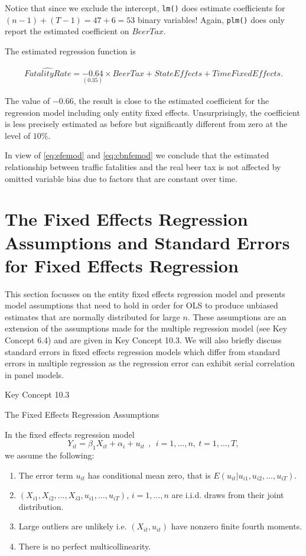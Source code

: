 \documentclass[]{book}
\theoremstyle{definition}
\theoremstyle{definition}
\theoremstyle{definition}
\theoremstyle{remark}
\begin{document}
Notice that since we exclude the intercept, \texttt{lm()} does estimate
coefficients for \((n-1) + (T-1) = 47 + 6 = 53\) binary variables!
Again, \texttt{plm()} does only report the estimated coefficient on
\(BeerTax\).

The estimated regression function is

\begin{align}
\widehat{FatalityRate} =  \underset{(0.35)}{-0.64} \times BeerTax + StateEffects + TimeFixedEffects. \label{eq:cbnfemod}
\end{align}

The value of \(-0.66\), the result is close to the estimated coefficient
for the regression model including only entity fixed effects.
Unsurprisingly, the coefficient is less precisely estimated as before
but significantly different from zero at the level of \(10\%\).

In view of \eqref{eq:efemod} and \eqref{eq:cbnfemod} we conclude that the
estimated relationship between traffic fatalities and the real beer tax
is not affected by omitted variable bias due to factors that are
constant over time.

\section{The Fixed Effects Regression Assumptions and Standard Errors
for Fixed Effects
Regression}\label{the-fixed-effects-regression-assumptions-and-standard-errors-for-fixed-effects-regression}

This section focusses on the entity fixed effects regression model and
presents model assumptions that need to hold in order for OLS to produce
unbiased estimates that are normally distributed for large \(n\). These
assumptions are an extension of the assumptions made for the multiple
regression model (see Key Concept 6.4) and are given in Key Concept
10.3. We will also briefly discuss standard errors in fixed effects
regression models which differ from standard errors in multiple
regression as the regression error can exhibit serial correlation in
panel models.

Key Concept 10.3

The Fixed Effects Regression Assumptions

In the fixed effects regression model
\[ Y_{it} = \beta_1 X_{it} + \alpha_i + u_{it} \ \ , \ \ i=1,\dots,n, \ t=1,\dots,T, \]
we assume the following:

\begin{enumerate}
\def\labelenumi{\arabic{enumi}.}
\item
  The error term \(u_{it}\) has conditional mean zero, that is
  \(E(u_{it}|u_{i1}, u_{i2},\dots, u_{iT})\).
\item
  \((X_{i1}, X_{i2}, \dots, X_{i3}, u_{i1}, \dots, u_{iT})\),
  \(i=1,\dots,n\) are i.i.d. draws from their joint distribution.
\item
  Large outliers are unlikely i.e. \((X_{it}, u_{it})\) have nonzero
  finite fourth moments.
\item
  There is no perfect multicollinearity.
\end{enumerate}
\end{document}
